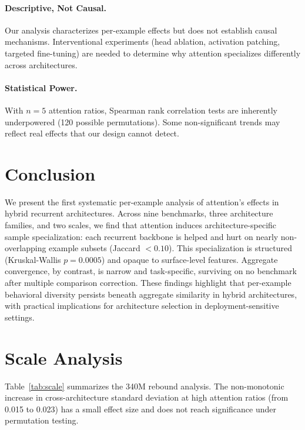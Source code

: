 \documentclass[11pt,a4paper]{article}
\begin{document}
\paragraph{Descriptive, Not Causal.}
Our analysis characterizes per-example effects but does not establish causal mechanisms. Interventional experiments (head ablation, activation patching, targeted fine-tuning) are needed to determine why attention specializes differently across architectures.

\paragraph{Statistical Power.}
With $n = 5$ attention ratios, Spearman rank correlation tests are inherently underpowered (120 possible permutations). Some non-significant trends may reflect real effects that our design cannot detect.

\section{Conclusion}

We present the first systematic per-example analysis of attention's effects in hybrid recurrent architectures. Across nine benchmarks, three architecture families, and two scales, we find that attention induces architecture-specific sample specialization: each recurrent backbone is helped and hurt on nearly non-overlapping example subsets (Jaccard $< 0.10$). This specialization is structured (Kruskal-Wallis $p = 0.0005$) and opaque to surface-level features. Aggregate convergence, by contrast, is narrow and task-specific, surviving on no benchmark after multiple comparison correction. These findings highlight that per-example behavioral diversity persists beneath aggregate similarity in hybrid architectures, with practical implications for architecture selection in deployment-sensitive settings.

\appendix

\section{Scale Analysis}
\label{app:scale}

Table~\ref{tab:scale} summarizes the 340M rebound analysis. The non-monotonic increase in cross-architecture standard deviation at high attention ratios (from 0.015 to 0.023) has a small effect size and does not reach significance under permutation testing.
\end{document}
